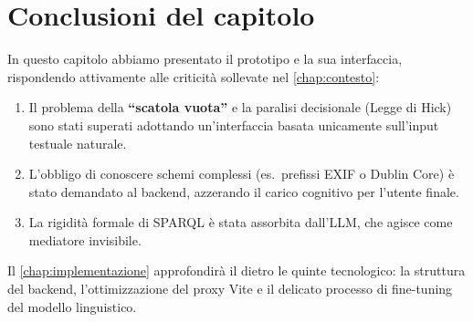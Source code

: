     \section{Conclusioni del capitolo}\label{sec:conclusioni_cap3}
        In questo capitolo abbiamo presentato il prototipo e la sua interfaccia, rispondendo attivamente alle criticità sollevate nel \cref{chap:contesto}:
        \begin{enumerate}
            \item Il problema della \textbf{``scatola vuota''} e la paralisi decisionale (Legge di Hick) sono stati superati adottando un'interfaccia basata unicamente sull'input testuale naturale.
            \item L'obbligo di conoscere schemi complessi (es.\ prefissi EXIF o Dublin Core) è stato demandato al backend, azzerando il carico cognitivo per l'utente finale.
        \item La rigidità formale di SPARQL è stata assorbita dall'LLM, che agisce come mediatore invisibile.
    \end{enumerate}

    Il \cref{chap:implementazione} approfondirà il dietro le quinte tecnologico: la struttura del backend, l'ottimizzazione del proxy Vite e il delicato processo di fine-tuning del modello linguistico.